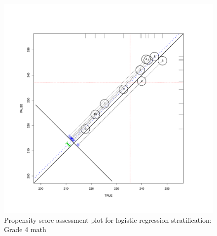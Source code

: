 \documentclass[letterpaper,12p,twoside]{article} %
\begin{document}

\begin{figure}[t]
\begin{center}
\includegraphics[width=\textwidth]{../Figures2009/g4math-circpsa10.pdf}
\caption{Propensity score assessment plot for logistic regression stratification: Grade 4 math}
\label{fig:g4math:circpsa}
\end{center}
\end{figure}
\end{document}
